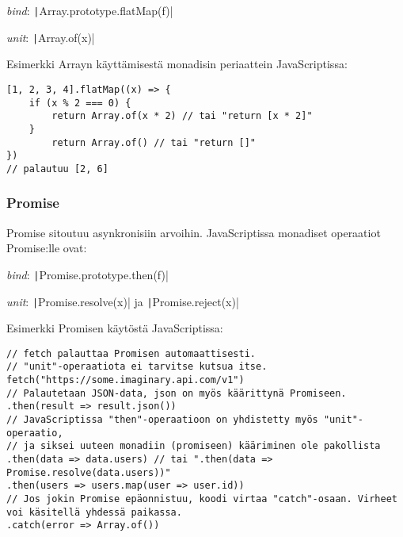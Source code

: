 \textit{bind}: \texttt|Array.prototype.flatMap(f)|

\textit{unit}: \texttt|Array.of(x)|

Esimerkki Arrayn käyttämisestä monadisin periaattein JavaScriptissa:

\begin{code}
    \begin{verbatim}
[1, 2, 3, 4].flatMap((x) => {
    if (x % 2 === 0) {
        return Array.of(x * 2) // tai "return [x * 2]"
    }
        return Array.of() // tai "return []"
})
// palautuu [2, 6]
\end{verbatim}
    \caption{Array-tietorakenteella monadinen bind-operaatio, jossa poistetaan parittomat luvut ja parilliset kerrotaan kahdella.}
    \label{code:array_monad_fr}
\end{code}


\subsubsection{Promise}

Promise sitoutuu asynkronisiin arvoihin. JavaScriptissa monadiset operaatiot Promise:lle ovat:

\textit{bind}: \texttt|Promise.prototype.then(f)|

\textit{unit}: \texttt|Promise.resolve(x)| ja \texttt|Promise.reject(x)|

Esimerkki Promisen käytöstä JavaScriptissa:

\begin{code}
    \begin{verbatim}
// fetch palauttaa Promisen automaattisesti.
// "unit"-operaatiota ei tarvitse kutsua itse.
fetch("https://some.imaginary.api.com/v1") 
// Palautetaan JSON-data, json on myös käärittynä Promiseen.
.then(result => result.json()) 
// JavaScriptissa "then"-operaatioon on yhdistetty myös "unit"-operaatio,
// ja siksei uuteen monadiin (promiseen) kääriminen ole pakollista
.then(data => data.users) // tai ".then(data => Promise.resolve(data.users))"
.then(users => users.map(user => user.id))
// Jos jokin Promise epäonnistuu, koodi virtaa "catch"-osaan. Virheet voi käsitellä yhdessä paikassa.
.catch(error => Array.of()) 
\end{verbatim}
    \caption{Promise-tietorakenteella bind-operaatioden ketjutus, jossa haetaan käyttäjätietoja kuvitteellisesta ulkoisesta rajapinnasta}
    \label{code:promise_monad_fr}
\end{code}


